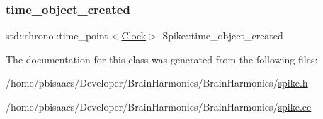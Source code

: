 \mbox{\label{classSpike_ae9e73c1745176138c2f2474c4dfdf89e}} 
\subsubsection{\texorpdfstring{time\+\_\+object\+\_\+created}{time\_object\_created}}
{\footnotesize\ttfamily std\+::chrono\+::time\+\_\+point$<$\mbox{\hyperlink{universe_8h_a0ef8d951d1ca5ab3cfaf7ab4c7a6fd80}{Clock}}$>$ Spike\+::time\+\_\+object\+\_\+created\hspace{0.3cm}{\ttfamily [private]}}



The documentation for this class was generated from the following files\+:\begin{DoxyCompactItemize}
\item 
/home/pbisaacs/\+Developer/\+Brain\+Harmonics/\+Brain\+Harmonics/\mbox{\hyperlink{spike_8h}{spike.\+h}}\item 
/home/pbisaacs/\+Developer/\+Brain\+Harmonics/\+Brain\+Harmonics/\mbox{\hyperlink{spike_8cc}{spike.\+cc}}\end{DoxyCompactItemize}
